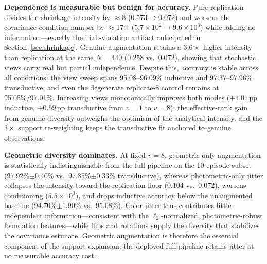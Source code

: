 \documentclass[preprint,12pt]{elsarticle}
\begin{document}
\textbf{Dependence is measurable but benign for accuracy.} Pure replication divides the shrinkage intensity by $\approx$8 ($0.573\to0.072$) and worsens the covariance condition number by $\approx$17$\times$ ($5.7\times10^{2}\to9.6\times10^{3}$) while adding no information---exactly the i.i.d.-violation artifact anticipated in Section~\ref{sec:shrinkage}. Genuine augmentation retains a $3.6\times$ higher intensity than replication at the same $N=440$ ($0.258$ vs.\ $0.072$), showing that stochastic views carry real but partial independence. Despite this, accuracy is stable across all conditions: the view sweep spans 95.08--96.09\% inductive and 97.37--97.96\% transductive, and even the degenerate replicate-8 control remains at 95.05\%/97.01\%. Increasing views monotonically improves both modes ($+1.01$\,pp inductive, $+0.59$\,pp transductive from $v=1$ to $v=8$): the effective-rank gain from genuine diversity outweighs the optimism of the analytical intensity, and the $3\times$ support re-weighting keeps the transductive fit anchored to genuine observations.

\textbf{Geometric diversity dominates.} At fixed $v=8$, geometric-only augmentation is statistically indistinguishable from the full pipeline on the 10-episode subset (97.92\%$\pm$0.40\% vs.\ 97.85\%$\pm$0.33\% transductive), whereas photometric-only jitter collapses the intensity toward the replication floor ($0.104$ vs.\ $0.072$), worsens conditioning ($5.5\times10^{3}$), and drops inductive accuracy below the unaugmented baseline (94.70\%$\pm$1.90\% vs.\ 95.08\%). Color jitter thus contributes little independent information---consistent with the $\ell_2$-normalized, photometric-robust foundation features---while flips and rotations supply the diversity that stabilizes the covariance estimate. Geometric augmentation is therefore the essential component of the support expansion; the deployed full pipeline retains jitter at no measurable accuracy cost.
\end{document}
